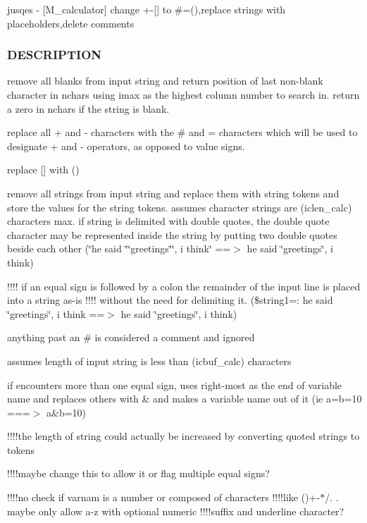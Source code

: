 jusqes -\/ \mbox{[}M\+\_\+calculator\mbox{]} change +-\/\mbox{[}\mbox{]} to \#=(),replace strings with placeholders,delete comments 

\subsubsection*{D\+E\+S\+C\+R\+I\+P\+T\+I\+ON}

remove all blanks from input string and return position of last non-\/blank character in nchars using imax as the highest column number to search in. return a zero in nchars if the string is blank.

replace all + and -\/ characters with the \# and = characters which will be used to designate + and -\/ operators, as opposed to value signs.

replace \mbox{[}\mbox{]} with ()

remove all strings from input string and replace them with string tokens and store the values for the string tokens. assumes character strings are (iclen\+\_\+calc) characters max. if string is delimited with double quotes, the double quote character may be represented inside the string by putting two double quotes beside each other (\char`\"{}he said \char`\"{}\char`\"{}greetings\char`\"{}\char`\"{}, i think\char`\"{} ==$>$ he said \char`\"{}greetings\char`\"{}, i think)

!!!! if an equal sign is followed by a colon the remainder of the input line is placed into a string as-\/is !!!! without the need for delimiting it. (\$string1=\+: he said \char`\"{}greetings\char`\"{}, i think ==$>$ he said \char`\"{}greetings\char`\"{}, i think)

anything past an \# is considered a comment and ignored

assumes length of input string is less than (icbuf\+\_\+calc) characters

if encounters more than one equal sign, uses right-\/most as the end of variable name and replaces others with \& and makes a variable name out of it (ie a=b=10 ===$>$ a\&b=10)

!!!!the length of string could actually be increased by converting quoted strings to tokens

!!!!maybe change this to allow it or flag multiple equal signs?

!!!!no check if varnam is a number or composed of characters !!!!like ()+-\/$\ast$/. . maybe only allow a-\/z with optional numeric !!!!suffix and underline character?

